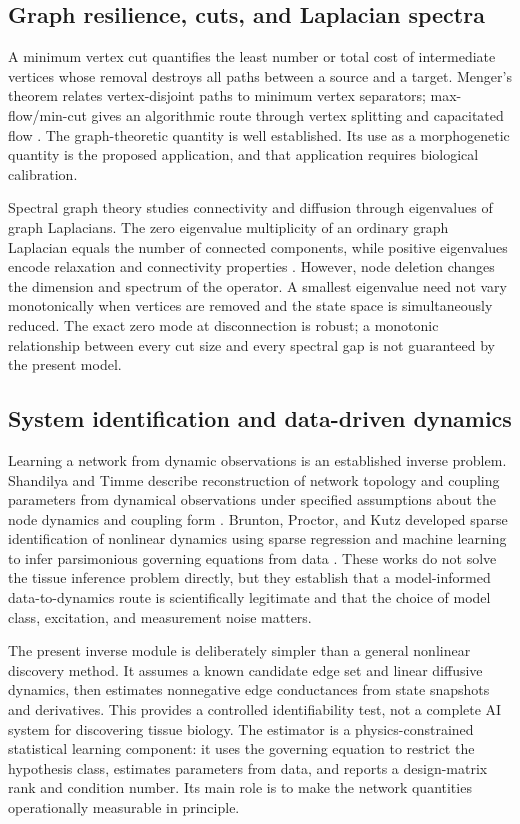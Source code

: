 \documentclass[12pt,a4paper]{article}
\begin{document}
\subsection{Graph resilience, cuts, and Laplacian spectra}
A minimum vertex cut quantifies the least number or total cost of intermediate vertices whose removal destroys all paths between a source and a target. Menger's theorem relates vertex-disjoint paths to minimum vertex separators; max-flow/min-cut gives an algorithmic route through vertex splitting and capacitated flow \citep{FordFulkerson1956}. The graph-theoretic quantity is well established. Its use as a morphogenetic quantity is the proposed application, and that application requires biological calibration.

Spectral graph theory studies connectivity and diffusion through eigenvalues of graph Laplacians. The zero eigenvalue multiplicity of an ordinary graph Laplacian equals the number of connected components, while positive eigenvalues encode relaxation and connectivity properties \citep{Chung1997}. However, node deletion changes the dimension and spectrum of the operator. A smallest eigenvalue need not vary monotonically when vertices are removed and the state space is simultaneously reduced. The exact zero mode at disconnection is robust; a monotonic relationship between every cut size and every spectral gap is not guaranteed by the present model.

\subsection{System identification and data-driven dynamics}
Learning a network from dynamic observations is an established inverse problem. Shandilya and Timme describe reconstruction of network topology and coupling parameters from dynamical observations under specified assumptions about the node dynamics and coupling form \citep{ShandilyaTimme2011}. Brunton, Proctor, and Kutz developed sparse identification of nonlinear dynamics using sparse regression and machine learning to infer parsimonious governing equations from data \citep{Brunton2016}. These works do not solve the tissue inference problem directly, but they establish that a model-informed data-to-dynamics route is scientifically legitimate and that the choice of model class, excitation, and measurement noise matters.

The present inverse module is deliberately simpler than a general nonlinear discovery method. It assumes a known candidate edge set and linear diffusive dynamics, then estimates nonnegative edge conductances from state snapshots and derivatives. This provides a controlled identifiability test, not a complete AI system for discovering tissue biology. The estimator is a physics-constrained statistical learning component: it uses the governing equation to restrict the hypothesis class, estimates parameters from data, and reports a design-matrix rank and condition number. Its main role is to make the network quantities operationally measurable in principle.
\end{document}
